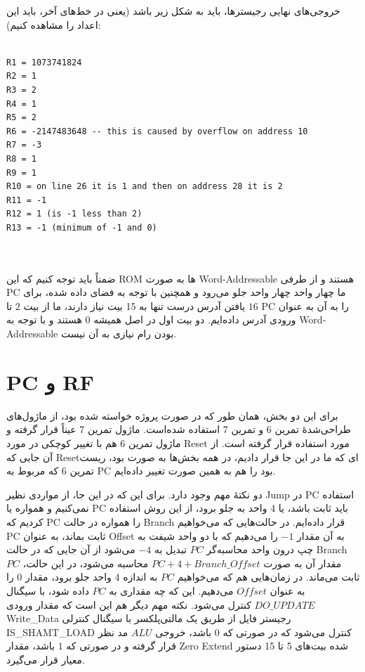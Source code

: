 \documentclass[12pt,titlepage,a4page , tikz , multi,table , svgnames,xcdraw]{article}
\begin{document}
خروجی‌های نهایی رجیسترها، باید به شکل زیر باشد (یعنی در خط‌های آخر، باید این اعداد را مشاهده کنیم):


\begin{latin}

\begin{verbatim}

R1 = 1073741824
R2 = 1
R3 = 2
R4 = 1
R5 = 2
R6 = -2147483648 -- this is caused by overflow on address 10
R7 = -3
R8 = 1
R9 = 1
R10 = on line 26 it is 1 and then on address 28 it is 2
R11 = -1
R12 = 1 (is -1 less than 2)
R13 = -1 (minimum of -1 and 0)



\end{verbatim}


\end{latin}

ضمناً باید توجه کنیم که این ROM ها به صورت Word-Addressable هستند و از طرفی PC ما چهار واحد چهار واحد جلو می‌رود و همچنین با توجه به فضای داده شده، برای یافتن آدرس درست تنها به 15 بیت نیاز دارند، ما از بیت $2$ تا $16$ PC را به آن به عنوان ورودی آدرس داده‌ایم. دو بیت اول در اصل همیشه $0$ هستند و با توجه به Word-Addressable بودن رام نیازی به آن نیست.



\section{PC و RF}

برای این دو بخش، همان طور که در صورت پروژه خواسته شده بود، از ماژول‌های طراحی‌شدهٔ تمرین 6 و تمرین 7 استفاده شده‌است. ماژول تمرین 7 عیناً قرار گرفته و ماژول تمرین 6 هم با تغییر کوچکی در مورد Reset مورد استفاده قرار گرفته است. از آن جایی که Resetای که ما در این جا قرار دادیم، در همه بخش‌ها به صورت  بود، ریست تمرین 6 که مربوط به PC بود را هم به همین صورت تغییر داده‌ایم.

دو نکتهٔ مهم وجود دارد. برای این که در این جا، از مواردی نظیر Jump در PC استفاده نمی‌کنیم و همواره یا PC باید ثابت باشد، یا 4 واحد به جلو برود، از این روش استفاده کردیم که PC را همواره در حالت Branch قرار داده‌ایم. در حالت‌هایی که می‌خواهیم PC ثابت بماند، به عنوان Offset به آن مقدار $-1$ را می‌دهیم که با دو واحد شیفت به چپ درون واحد محاسبه‌گر $PC$ تبدیل به $-4$ می‌شود از آن جایی که در حالت Branch مقدار آن به صورت $PC + 4 + Branch\_Offset$ محاسبه می‌شود، در این حالت، $PC$ ثابت می‌ماند. در زمان‌هایی هم که می‌خواهیم $PC$ به اندازه 4 واحد جلو برود، مقدار $0$ را به عنوان $Offset$ می‌دهیم. این که چه مقداری به $PC$ داده شود، با سیگنال $DO\_UPDATE$ کنترل می‌شود. نکته مهم دیگر هم این است که مقدار ورودی Write\_Data رجیستر فایل از طریق یک مالتی‌پلکسر با سیگنال کنترلی IS\_SHAMT\_LOAD کنترل می‌شود که در صورتی که $0$ باشد، خروجی $ALU$ مد نظر قرار گرفته و در صورتی که $1$ باشد، مقدار Zero Extend شده بیت‌های 5 تا 15 دستور معیار قرار می‌گیرد.
\end{document}
